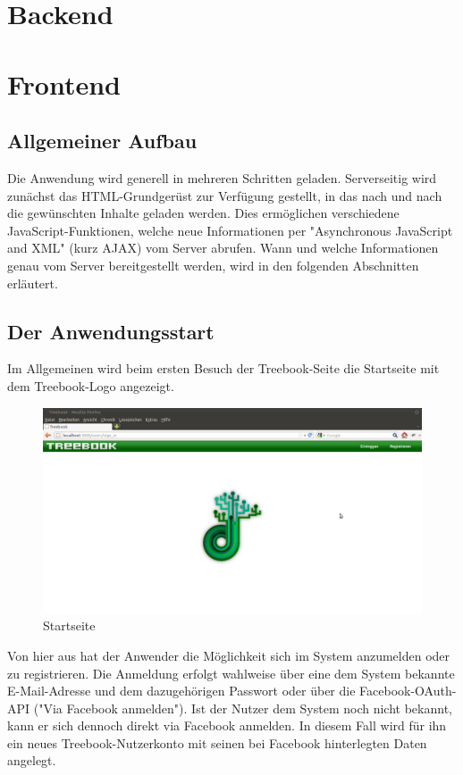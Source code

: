 \documentclass[10pt,a4paper]{book}
\makeatletter
\def\ScaleIfNeeded{%
\ifdim\Gin@nat@width>\linewidth
\linewidth
\else
\Gin@nat@width
\fi
}
\makeatother
\begin{document}
\chapter{Backend}

\chapter{Frontend}
\section{Allgemeiner Aufbau}
Die Anwendung wird generell in mehreren Schritten geladen. Serverseitig wird zunächst das HTML-Grundgerüst zur Verfügung gestellt, in das nach und nach die gewünschten Inhalte geladen werden.
Dies ermöglichen verschiedene JavaScript-Funktionen, welche neue Informationen per "Asynchronous JavaScript and XML" (kurz AJAX) vom Server abrufen.
Wann und welche Informationen genau vom Server bereitgestellt werden, wird in den folgenden Abschnitten erläutert.

\section{Der Anwendungsstart}
Im Allgemeinen wird beim ersten Besuch der Treebook-Seite die Startseite mit dem Treebook-Logo angezeigt.
\begin{figure}[htbp]
\centering
\includegraphics[width=\ScaleIfNeeded]{Pictures/screen_startup.png}%
\caption{Startseite}%
\end{figure}
Von hier aus hat der Anwender die Möglichkeit sich im System anzumelden oder zu registrieren.
Die Anmeldung erfolgt wahlweise über eine dem System bekannte E-Mail-Adresse und dem dazugehörigen Passwort oder über die Facebook-OAuth-API ("Via Facebook anmelden").
Ist der Nutzer dem System noch nicht bekannt, kann er sich dennoch direkt via Facebook anmelden. In diesem Fall wird für ihn ein neues Treebook-Nutzerkonto mit seinen bei Facebook hinterlegten Daten angelegt.
\end{document}
